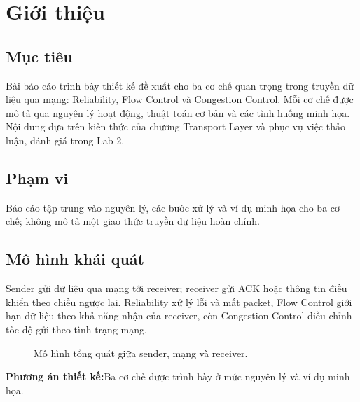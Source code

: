 \documentclass[11pt,a4paper]{article}
\newcommand{\proposallabel}{\textbf{\color{navy}Phương án thiết kế:}\enspace}
\begin{document}
\tableofcontents
\clearpage
{}
\setcounter{page}{1}

\section{Giới thiệu}
\subsection{Mục tiêu}
Bài báo cáo trình bày thiết kế đề xuất cho ba cơ chế quan trọng trong truyền dữ liệu qua mạng: Reliability, Flow Control và Congestion Control. Mỗi cơ chế được mô tả qua nguyên lý hoạt động, thuật toán cơ bản và các tình huống minh họa. Nội dung dựa trên kiến thức của chương Transport Layer và phục vụ việc thảo luận, đánh giá trong Lab 2.

\subsection{Phạm vi}
Báo cáo tập trung vào nguyên lý, các bước xử lý và ví dụ minh họa cho ba cơ chế; không mô tả một giao thức truyền dữ liệu hoàn chỉnh.

\subsection{Mô hình khái quát}
Sender gửi dữ liệu qua mạng tới receiver; receiver gửi ACK hoặc thông tin điều khiển theo chiều ngược lại. Reliability xử lý lỗi và mất packet, Flow Control giới hạn dữ liệu theo khả năng nhận của receiver, còn Congestion Control điều chỉnh tốc độ gửi theo tình trạng mạng.

\begin{figure}[H]
  \centering
  \caption{Mô hình tổng quát giữa sender, mạng và receiver.}
  \label{fig:overview}
\end{figure}
\proposallabel Ba cơ chế được trình bày ở mức nguyên lý và ví dụ minh họa.
\end{document}
